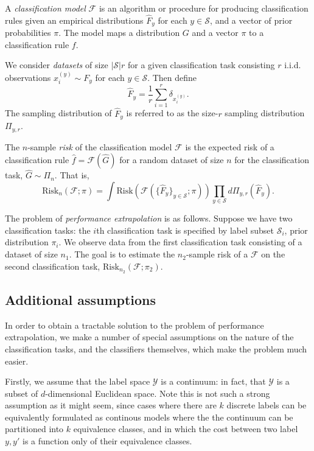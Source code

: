 \documentclass[12pt]{article}
\begin{document}
A \emph{classification model} $\mathcal{F}$ is an algorithm or
procedure for producing classification rules given an empirical
distributions $\hat{F}_y$ for each $y \in \mathcal{S}$, and a vector
of prior probabilities $\pi$.  The model maps a distribution $G$ and a
vector $\pi$ to a classification rule $f$.

We consider \emph{datasets} of size $|\mathcal{S}|r$ for a given
classification task consisting $r$ i.i.d. observations $x_i^{(y)} \sim
F_y$ for each $y \in \mathcal{S}$.  Then define 
\[\hat{F}_y = \frac{1}{r}\sum_{i=1}^r \delta_{x_i^{(y)}}.\]
The sampling distribution of $\hat{F}_y$ is referred to as the
size-$r$ sampling distribution $\Pi_{y, r}$.

The $n$-sample \emph{risk} of the classification model $\mathcal{F}$
is the expected risk of a classification rule $\hat{f} =
\mathcal{F}(\hat{G})$ for a random dataset of size $n$ for the
classification task, $\hat{G} \sim \Pi_n$.  That is,
\[
\text{Risk}_n(\mathcal{F}; \pi) =
\int \text{Risk}(\mathcal{F}(\{\hat{F}_y\}_{y \in \mathcal{S}};
\pi)) \prod_{y \in \mathcal{S}} d\Pi_{y, r}(\hat{F}_y).
\]

The problem of \emph{performance extrapolation} is as follows.
Suppose we have two classification tasks: the $i$th classification
task is specified by label subset $\mathcal{S}_i$, prior distribution
$\pi_i$.  We observe data from the first classification task
consisting of a dataset of size $n_1$.  The goal is to estimate the
$n_2$-sample risk of a $\mathcal{F}$ on the second classification
task, $\text{Risk}_{n_2}(\mathcal{F}; \pi_2)$.

\subsection{Additional assumptions}

In order to obtain a tractable solution to the problem of performance
extrapolation, we make a number of special assumptions on the nature
of the classification tasks, and the classifiers themselves, which
make the problem much easier.

Firstly, we assume that the label space $\mathcal{Y}$ is a continuum:
in fact, that $\mathcal{Y}$ is a subset of $d$-dimensional Euclidean
space. Note this is not such a strong assumption as it might seem,
since cases where there are $k$ discrete labels can be equivalently
formulated as continous models where the the continuum can be
partitioned into $k$ equivalence classes, and in which the cost
between two label $y, y'$ is a function only of their equivalence
classes.
\end{document}
